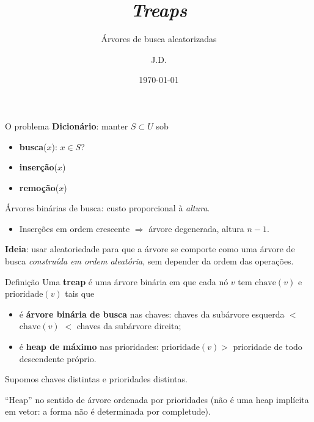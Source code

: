 \documentclass[aspectratio=169,11pt]{beamer}
\title{\textit{Treaps}}
\subtitle{Árvores de busca aleatorizadas}
\author{J.D.}
\institute{UFABC}
\date{\today}
\newcommand{\define}[1]{\textbf{#1}}
\theoremstyle{definition}
\begin{document}
\begin{frame}
  \titlepage
\end{frame}

\begin{frame}{O problema}
  \textbf{Dicionário}: manter $S\subset U$ sob
  \begin{itemize}
  \item \textbf{busca}($x$): $x\in S$?
  \item \textbf{inserção}($x$)
  \item \textbf{remoção}($x$)
  \end{itemize}
  \pause
  \vspace{1ex}
  Árvores binárias de busca: custo proporcional à \emph{altura}.
  \begin{itemize}
  \item Inserções em ordem crescente $\Rightarrow$ árvore degenerada,
    altura $n-1$.
  \end{itemize}
  \pause
  \vspace{1ex}
  \textbf{Ideia}: usar aleatoriedade para que a árvore se comporte como
  uma árvore de busca \emph{construída em ordem aleatória}, sem
  depender da ordem das operações.
\end{frame}

\begin{frame}{Definição}
  Uma \define{treap} é uma árvore binária em que cada nó $v$ tem
  $\mathrm{chave}(v)$ e $\mathrm{prioridade}(v)$ tais que
  \begin{itemize}
  \item é \textbf{árvore binária de busca} nas chaves:
    chaves da subárvore esquerda $<$ $\mathrm{chave}(v)$ $<$ chaves da
    subárvore direita;
  \item é \textbf{heap de máximo} nas prioridades:
    $\mathrm{prioridade}(v)>$ prioridade de todo descendente próprio.
  \end{itemize}
  \vspace{1ex}
  Supomos chaves distintas e prioridades distintas.

  \medskip
  \small
  ``Heap'' no sentido de árvore ordenada por prioridades (não é uma
  heap implícita em vetor: a forma não é determinada por completude).
\end{frame}
\end{document}
